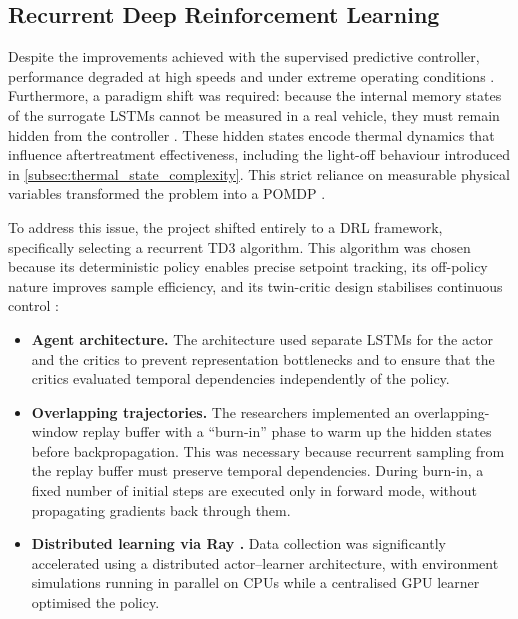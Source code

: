 \subsection{Recurrent Deep Reinforcement Learning}
Despite the improvements achieved with the supervised predictive controller, performance degraded at high speeds and under extreme operating conditions \cite{universitat_politecnica_de_catalunya_development_2025}. Furthermore, a paradigm shift was required: because the internal memory states of the surrogate \ac{LSTM}s cannot be measured in a real vehicle, they must remain hidden from the controller \cite{universitat_politecnica_de_catalunya_development_2025}. These hidden states encode thermal dynamics that influence aftertreatment effectiveness, including the light-off behaviour introduced in \autoref{subsec:thermal_state_complexity}. This strict reliance on measurable physical variables transformed the problem into a \ac{POMDP} \cite{universitat_politecnica_de_catalunya_development_2025}.

To address this issue, the project shifted entirely to a \ac{DRL} framework, specifically selecting a recurrent \ac{TD3} algorithm. This algorithm was chosen because its deterministic policy enables precise setpoint tracking, its off-policy nature improves sample efficiency, and its twin-critic design stabilises continuous control \cite{universitat_politecnica_de_catalunya_development_2025}:

\begin{itemize}
  \item \textbf{Agent architecture.} The architecture used separate \ac{LSTM}s for the actor and the critics to prevent representation bottlenecks and to ensure that the critics evaluated temporal dependencies independently of the policy.
  \item \textbf{Overlapping trajectories.} The researchers implemented an overlapping-window replay buffer with a ``burn-in'' phase to warm up the hidden states before backpropagation. This was necessary because recurrent sampling from the replay buffer must preserve temporal dependencies. During burn-in, a fixed number of initial steps are executed only in forward mode, without propagating gradients back through them.
  \item \textbf{Distributed learning via Ray \cite{liang_rllib_2017}.} Data collection was significantly accelerated using a distributed actor--learner architecture, with environment simulations running in parallel on CPUs while a centralised GPU learner optimised the policy.
\end{itemize}

